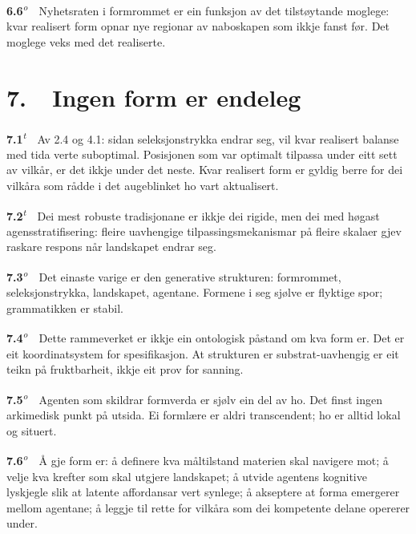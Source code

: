 \documentclass[10pt]{article}
\begin{document}
\noindent\textbf{6.6}\textsuperscript{\textit{o}}~~Nyhetsraten i formrommet er ein funksjon av det tilstøytande moglege: kvar realisert form opnar nye regionar av naboskapen som ikkje fanst før. Det moglege veks med det realiserte.







\chapter*{7.~~Ingen form er endeleg}




\noindent\textbf{7.1}\textsuperscript{\textit{t}}~~Av 2.4 og 4.1: sidan seleksjonstrykka endrar seg, vil kvar realisert balanse med tida verte suboptimal. Posisjonen som var optimalt tilpassa under eitt sett av vilkår, er det ikkje under det neste. Kvar realisert form er gyldig berre for dei vilkåra som rådde i det augeblinket ho vart aktualisert.




\noindent\textbf{7.2}\textsuperscript{\textit{t}}~~Dei mest robuste tradisjonane er ikkje dei rigide, men dei med høgast agensstratifisering: fleire uavhengige tilpassingsmekanismar på fleire skalaer gjev raskare respons når landskapet endrar seg.




\noindent\textbf{7.3}\textsuperscript{\textit{o}}~~Det einaste varige er den generative strukturen: formrommet, seleksjonstrykka, landskapet, agentane. Formene i seg sjølve er flyktige spor; grammatikken er stabil.




\noindent\textbf{7.4}\textsuperscript{\textit{o}}~~Dette rammeverket er ikkje ein ontologisk påstand om kva form er. Det er eit koordinatsystem for spesifikasjon. At strukturen er substrat-uavhengig er eit teikn på fruktbarheit, ikkje eit prov for sanning.




\noindent\textbf{7.5}\textsuperscript{\textit{o}}~~Agenten som skildrar formverda er sjølv ein del av ho. Det finst ingen arkimedisk punkt på utsida. Ei formlære er aldri transcendent; ho er alltid lokal og situert.




\noindent\textbf{7.6}\textsuperscript{\textit{o}}~~Å gje form er: å definere kva måltilstand materien skal navigere mot; å velje kva krefter som skal utgjere landskapet; å utvide agentens kognitive lyskjegle slik at latente affordansar vert synlege; å akseptere at forma emergerer mellom agentane; å leggje til rette for vilkåra som dei kompetente delane opererer under.
\end{document}
